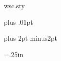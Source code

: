 \begin{filecontents*}{wsc.sty}
\let\savesubsub\subsubsection
\def\subsubsection#1{\savesubsub{\ \ #1}}


\parskip=0pt plus .01pt


\let\saveparagraph\paragraph
\def\paragraph#1{\vskip1sp
{\bf #1}\hskip1em\relax}


\raggedbottom

\newenvironment{hangref}{\begin{list}{}{\setlength{\itemsep}{0pt}
\setlength{\parsep}{0pt}\setlength{\rightmargin}{0pt}
\setlength{\leftmargin}{+\parindent}
\setlength{\itemindent}{-\parindent}}}{\end{list}}


\newif\iftitle
\def\@oddhead{\iftitle\global\titlefalse
\vtop to0pt{\hbox to.9\textwidth{\titlepageheadfont
\currentCaption\hfill}%
\vskip2pt \hbox to .9\textwidth{\titlepageheadfont
\currentEditors\hfill}%
\vss} \else \hbox
to\textwidth{\titlepageheadfont\hfill\thetitle\hfill}\fi}

\def\@evenhead{\iftitle\global\titlefalse\fi%
\hbox to \textwidth{\hss\titlepageheadfont \theauthors\hss}}

\let\@oddfoot\relax
\let\@evenfoot\@oddfoot

\def\ttitle#1{\gdef\thetitle{#1}}


\def\sk{\vskip12pt}
\let\vs\sk
\def\bd{\vskip2pt\noindent} %

\spaceskip=3.5pt plus 2pt minus2pt

\parindent=.25in


\end{filecontents*}

